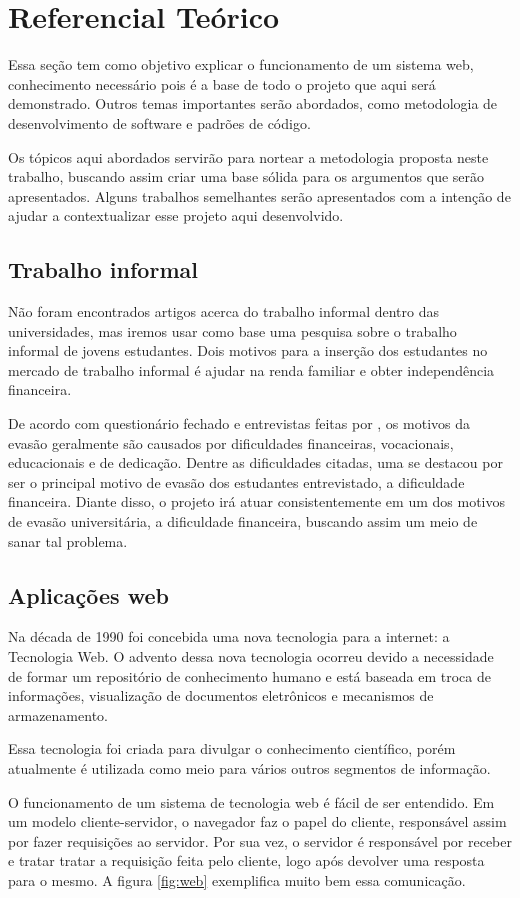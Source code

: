 \chapter{Referencial Teórico}
Essa seção tem como objetivo explicar o funcionamento de um sistema web, conhecimento necessário pois é a base de todo o projeto que aqui será demonstrado. Outros temas importantes serão abordados, como metodologia de desenvolvimento de software e padrões de código. \par
Os tópicos aqui abordados servirão para nortear a metodologia proposta neste trabalho, buscando assim criar uma base sólida para os argumentos que serão apresentados. Alguns trabalhos semelhantes serão apresentados com a intenção de ajudar a contextualizar esse projeto aqui desenvolvido.


\section{Trabalho informal}
Não foram encontrados artigos acerca do trabalho informal dentro das universidades, mas iremos usar como base uma pesquisa sobre o trabalho informal de jovens estudantes. Dois motivos para a inserção dos estudantes no mercado de trabalho informal é ajudar na renda familiar e obter independência financeira\cite{ferreira2009trabalhojovem}. \par
De acordo com questionário fechado e entrevistas feitas por \cite{ribeiro2005evasao}, os motivos da evasão geralmente são causados por dificuldades financeiras, vocacionais, educacionais e de dedicação. Dentre as dificuldades citadas, uma se destacou por ser o principal motivo de evasão dos estudantes entrevistado, a dificuldade financeira. Diante disso, o projeto irá atuar consistentemente em um dos motivos de evasão universitária, a dificuldade financeira, buscando assim um meio de sanar tal problema.

\section{Aplicações web}
\label{sec:trabalhos_correlatos}

Na década de 1990 foi concebida uma nova tecnologia para a internet: a Tecnologia Web\cite{zaneti2005construcao}. O advento dessa nova tecnologia ocorreu devido a necessidade de formar um repositório de conhecimento humano \cite{lee1994www} e está baseada em troca de informações, visualização de documentos eletrônicos e mecanismos de armazenamento. \par
Essa tecnologia foi criada para divulgar o conhecimento científico, porém atualmente é utilizada como meio para vários outros segmentos de informação\cite{zaneti2005construcao}. \par
O funcionamento de um sistema de tecnologia web é fácil de ser entendido. Em um modelo cliente-servidor, o navegador faz o papel do cliente, responsável assim por fazer requisições ao servidor. Por sua vez, o servidor é responsável por receber e tratar tratar a requisição feita pelo cliente, logo após devolver uma resposta para o mesmo\cite{sousa2016desenvolvimento}. A figura \ref{fig:web} exemplifica muito bem essa comunicação.

